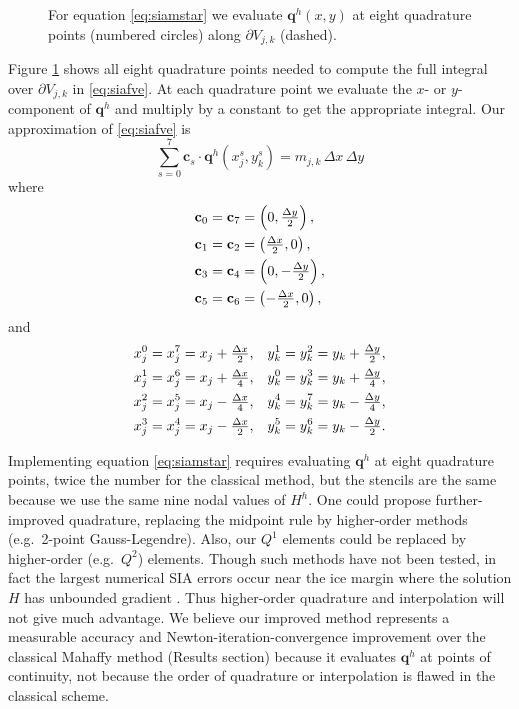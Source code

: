 \documentclass[twocolumn,a4paper]{igs}
\newcommand\bc{\mathbf{c}}
\newcommand\bq{\mathbf{q}}
\begin{document}
\begin{figure}[ht]
\begin{center}

\end{center}
\caption{For equation \eqref{eq:siamstar} we evaluate $\bq^h(x,y)$ at eight quadrature points (numbered circles) along $\partial V_{j,k}$ (dashed).}
\label{fig:improvequadrature}
\end{figure}

Figure \ref{fig:improvequadrature} shows all eight quadrature points needed to compute the full integral over $\partial V_{j,k}$ in \eqref{eq:siafve}.  At each quadrature point we evaluate the $x$- or $y$-component of $\bq^h$ and multiply by a constant to get the appropriate integral.  Our approximation of \eqref{eq:siafve} is
\begin{equation}
\sum_{s=0}^7 \bc_s \cdot \bq^h(x_j^s,y_k^s) = m_{j,k}\,\Delta x\,\Delta y  \label{eq:siamstar}
\end{equation}
where
\begin{align}
\bc_0 &= \bc_7 = \left(0, \tfrac{\Delta y}{2}\right),  \label{eq:cs} \\
\bc_1 &= \bc_2 = \left(\tfrac{\Delta x}{2},0\right),  \notag \\
\bc_3 &= \bc_4 = \left(0, -\tfrac{\Delta y}{2}\right),  \notag \\
\bc_5 &= \bc_6 = \left(-\tfrac{\Delta x}{2},0\right),  \notag
\end{align}
and
\begin{align}
x_j^0 &= x_j^7 = x_j + \tfrac{\Delta x}{2}, & y_k^1 &= y_k^2 = y_k + \tfrac{\Delta y}{2}, \label{eq:xjsyks} \\
x_j^1 &= x_j^6 = x_j + \tfrac{\Delta x}{4}, & y_k^0 &= y_k^3 = y_k + \tfrac{\Delta y}{4}, \notag \\
x_j^2 &= x_j^5 = x_j - \tfrac{\Delta x}{4}, & y_k^4 &= y_k^7 = y_k - \tfrac{\Delta y}{4}, \notag \\
x_j^3 &= x_j^4 = x_j - \tfrac{\Delta x}{2}, & y_k^5 &= y_k^6 = y_k - \tfrac{\Delta y}{2}. \notag
\end{align}

Implementing equation \eqref{eq:siamstar} requires evaluating $\bq^h$ at eight quadrature points, twice the number for the classical method, but the stencils are the same because we use the same nine nodal values of $H^h$.  One could propose further-improved quadrature, replacing the midpoint rule by higher-order methods (e.g.~2-point Gauss-Legendre).  Also, our $Q^1$ elements could be replaced by higher-order (e.g.~$Q^2$) elements.  Though such methods have not been tested, in fact the largest numerical SIA errors occur near the ice margin where the solution $H$ has unbounded gradient \citep{Bueleretal2005}.  Thus higher-order quadrature and interpolation will not give much advantage.  We believe our improved method represents a measurable accuracy and Newton-iteration-convergence improvement over the classical Mahaffy method (Results section) because it evaluates $\bq^h$ at points of continuity, not because the order of quadrature or interpolation is flawed in the classical scheme.
\end{document}
